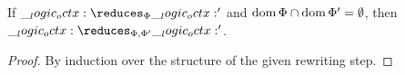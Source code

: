 \begin{lemma}[Weakening]
  If $\octx \reduces_{\orsig} \octx'$ and $\operatorname{dom}{\Phi} \cap \operatorname{dom}{\Phi'} = \emptyset$, then $\octx \reduces_{\orsig, \orsig'} \octx'$.
\end{lemma}
\begin{proof}
  By induction over the structure of the given rewriting step.
\end{proof}

  
  
